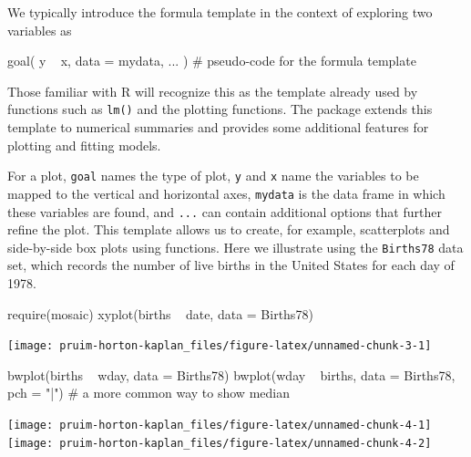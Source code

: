 We typically introduce the formula template in the context of exploring
two variables as

\begin{Schunk}
\begin{Sinput}
goal( y ~ x, data = mydata, ... )    # pseudo-code for the formula template
\end{Sinput}
\end{Schunk}

\noindent
Those familiar with R will recognize this as the template already used
by functions such as \texttt{lm()} and the  plotting
functions. The  package extends this template to numerical
summaries and provides some additional features for plotting and fitting
models.

For a plot, \texttt{goal} names the type of plot, \texttt{y} and
\texttt{x} name the variables to be mapped to the vertical and
horizontal axes, \texttt{mydata} is the data frame in which these
variables are found, and \texttt{...} can contain additional options
that further refine the plot. This template allows us to create, for
example, scatterplots and side-by-side box plots using 
functions. Here we illustrate using the \texttt{Births78} data set,
which records the number of live births in the United States for each
day of 1978.

\begin{Schunk}
\begin{Sinput}
require(mosaic) 
xyplot(births ~ date, data = Births78)
\end{Sinput}


\begin{center}\texttt{[image: pruim-horton-kaplan\_files/figure-latex/unnamed-chunk-3-1]} \end{center}

\end{Schunk}\begin{Schunk}
\begin{Sinput}
bwplot(births ~ wday, data = Births78) 
bwplot(wday ~ births, data = Births78, pch = "|")  # a more common way to show median
\end{Sinput}


\begin{center}\texttt{[image: pruim-horton-kaplan\_files/figure-latex/unnamed-chunk-4-1]} \texttt{[image: pruim-horton-kaplan\_files/figure-latex/unnamed-chunk-4-2]} \end{center}

\end{Schunk}

